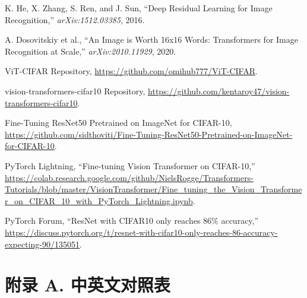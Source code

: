 \documentclass[UTF8]{report}
\theoremstyle{MyLineTheoremStyle} %
\theoremstyle{MyBlockTheoremStyle} %
\theoremstyle{MySubsubsectionStyle} %
\begin{document}
\begin{thebibliography}{9}
K. He, X. Zhang, S. Ren, and J. Sun, ``Deep Residual Learning for Image Recognition,'' \textit{arXiv:1512.03385}, 2016.

A. Dosovitskiy et al., ``An Image is Worth 16x16 Words: Transformers for Image Recognition at Scale,'' \textit{arXiv:2010.11929}, 2020.

ViT-CIFAR Repository, \url{https://github.com/omihub777/ViT-CIFAR}.

vision-transformers-cifar10 Repository, \url{https://github.com/kentaroy47/vision-transformers-cifar10}.

Fine-Tuning ResNet50 Pretrained on ImageNet for CIFAR-10, \url{https://github.com/sidthoviti/Fine-Tuning-ResNet50-Pretrained-on-ImageNet-for-CIFAR-10}.

PyTorch Lightning, ``Fine-tuning Vision Transformer on CIFAR-10,'' \url{https://colab.research.google.com/github/NielsRogge/Transformers-Tutorials/blob/master/VisionTransformer/Fine_tuning_the_Vision_Transformer_on_CIFAR_10_with_PyTorch_Lightning.ipynb}.

PyTorch Forum, ``ResNet with CIFAR10 only reaches 86\% accuracy,'' \url{https://discuss.pytorch.org/t/resnet-with-cifar10-only-reaches-86-accuracy-expecting-90/135051}.
\end{thebibliography}









\chapter*{附录 A. 中英文对照表}   
\thispagestyle{plain} 
\setcounter{section}{0}   
\renewcommand\thesection{A.\arabic{section}}   
\renewcommand{\thefigure}{A.\arabic{figure}} 
\renewcommand{\thetable}{A.\arabic{table}}
\end{document}
